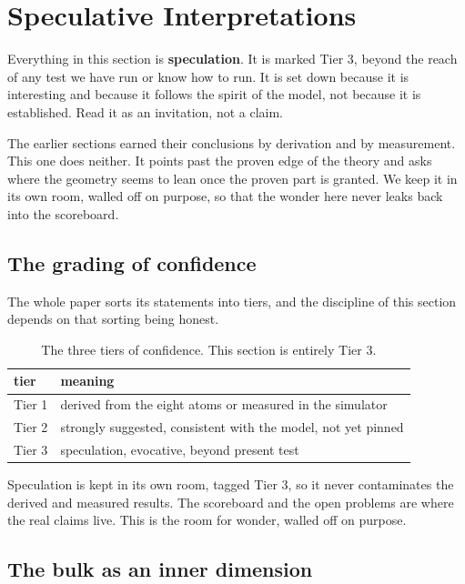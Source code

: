 \section{Speculative Interpretations}

Everything in this section is \textbf{speculation}. It is marked Tier 3, beyond the reach of any test we have run or know how to run. It is set down because it is interesting and because it follows the spirit of the model, not because it is established. Read it as an invitation, not a claim.

The earlier sections earned their conclusions by derivation and by measurement. This one does neither. It points past the proven edge of the theory and asks where the geometry seems to lean once the proven part is granted. We keep it in its own room, walled off on purpose, so that the wonder here never leaks back into the scoreboard.

\subsection{The grading of confidence}

The whole paper sorts its statements into tiers, and the discipline of this section depends on that sorting being honest.

\begin{table}[ht]
\centering
\begin{tabular}{@{}ll@{}}
\toprule
tier & meaning \\
\midrule
Tier 1 & derived from the eight atoms or measured in the simulator \\
Tier 2 & strongly suggested, consistent with the model, not yet pinned \\
Tier 3 & speculation, evocative, beyond present test \\
\bottomrule
\end{tabular}
\caption{The three tiers of confidence. This section is entirely Tier 3.}
\label{tab:tiers-speculative}
\end{table}

\begin{principle}
Speculation is kept in its own room, tagged Tier 3, so it never contaminates the derived and measured results. The scoreboard and the open problems are where the real claims live. This is the room for wonder, walled off on purpose.
\end{principle}

\subsection{The bulk as an inner dimension}

